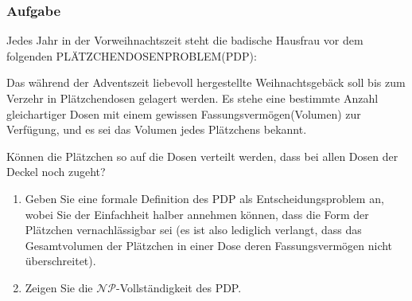 \documentclass{beamer}
\begin{document}
\begin{frame}
\frametitle{Aufgabe}
Jedes Jahr in der Vorweihnachtszeit steht die badische Hausfrau vor dem folgenden PLÄTZCHENDOSENPROBLEM(PDP):

\hspace{1cm}\parbox{0.8\textwidth}{Das während der Adventszeit liebevoll hergestellte Weihnachtsgebäck soll bis zum Verzehr in Plätzchendosen gelagert werden.
Es stehe eine bestimmte Anzahl gleichartiger Dosen mit einem gewissen Fassungsvermögen(Volumen) zur Verfügung, und es sei das Volumen jedes Plätzchens bekannt.

Können die Plätzchen so auf die Dosen verteilt werden, dass bei allen Dosen der Deckel noch zugeht?}
\begin{enumerate}
 \item Geben Sie eine formale Definition des PDP als Entscheidungsproblem an, wobei Sie der Einfachheit halber annehmen können, dass die Form der Plätzchen vernachlässigbar sei (es ist also lediglich verlangt, dass das Gesamtvolumen der Plätzchen in einer Dose deren Fassungsvermögen nicht überschreitet).
 \item Zeigen Sie die $\mathcal{NP}$-Vollständigkeit des PDP.
\end{enumerate}
\end{frame}



\end{document}
